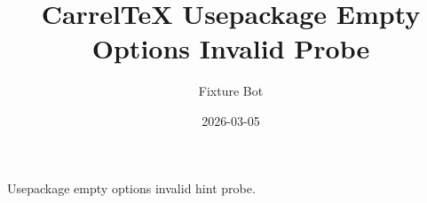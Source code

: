 \documentclass{article}
\title{CarrelTeX Usepackage Empty Options Invalid Probe}
\author{Fixture Bot}
\date{2026-03-05}
\begin{document}
\maketitle

Usepackage empty options invalid hint probe.
\end{document}

